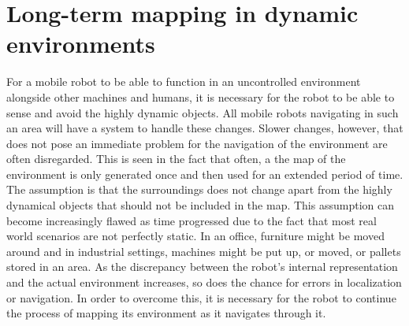 \chapter{Long-term mapping in dynamic environments}
\label{long_term_mapping}
For a mobile robot to be able to function in an uncontrolled environment alongside other machines and humans, it is necessary for the robot to be able to sense and avoid the highly dynamic objects. All mobile robots navigating in such an area will have a system to handle these changes. Slower changes, however, that does not pose an immediate problem for the navigation of the environment are often disregarded. This is seen in the fact that often, a the map of the environment is only generated once and then used for an extended period of time. The assumption is that the surroundings does not change apart from the highly dynamical objects that should not be included in the map. This assumption can become increasingly flawed as time progressed due to the fact that most real world scenarios are not perfectly static. In an office, furniture might be moved around and in industrial settings, machines might be put up, or moved, or pallets stored in an area. As the discrepancy between the robot's internal representation and the actual environment increases, so does the chance for errors in localization or navigation. In order to overcome this, it is necessary for the robot to continue the process of mapping its environment as it navigates through it.
%






